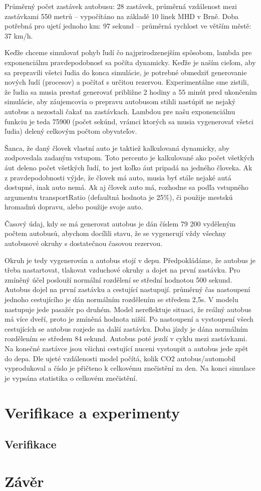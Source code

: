 \documentclass[a4paper, 11pt]{article}
\begin{document}
Průměrný počet zastávek autobusu: 28 zastávek, průměrná vzdálenost mezi zastávkami 550 metrů – vypočítáno na základě 10 linek MHD v Brně. Doba potřebná pro ujetí jednoho km: 97 sekund – průměrná rychlost ve větším městě: 37 km/h. 

Keďže chceme simulovať pohyb ľudí čo najprirodzenejším spôsobom, lambda pre exponenciálnu pravdepodobnosť sa počíta dynamicky. Keďže je naším cieľom, aby sa prepravili všetci ľudia do konca simulácie, je potrebné obmedziť generovanie nových ľudí (procesov) a počítať s určitou rezervou. Experimentálne sme zistili, že ľudia sa musia prestať generovať približne 2 hodiny a 55 minút pred ukončením simulácie, aby záujemcovia o prepravu autobusom stihli nastúpiť ne nejaký autobus a nezostali čakať na zastávkach. Lambdou pre našu exponenciálnu funkciu je teda 75900 (počet sekúnd, vrámci ktorých sa musia vygenerovať všetci ľudia) delený celkovým počtom obyvateľov.

Šanca, že daný človek vlastní auto je taktiež kalkulovaná dynamicky, aby zodpovedala zadaným vstupom. Toto percento je kalkulované ako počet všetkých áut deleno počet všetkých ľudí, to jest koľko áut pripadá na jedného človeka. Ak z pravdepodobnosti výjde, že človek má auto, musia byť stále nejaké autá dostupné, inak auto nemá. Ak aj človek auto má, rozhodne sa podľa vstupného argumentu transportRatio (defaultná hodnota je 25\%), či použije mestskú hromadnú dopravu, alebo použije svoje auto. 



Časový údaj, kdy se má generovat autobus je dán číslem 79 200 vyděleným počtem autobusů, abychom docílili stavu, že se vygenerují vždy všechny autobusové okruhy s dostatečnou časovou rezervou. 

Okruh je tedy vygenerován a autobus stojí v depu. Předpokládáme, že autobus je třeba nastartovat, tlakovat vzduchové okruhy a dojet na první zastávku. Pro zmíněný účel poslouží normální rozdělení se střední hodnotou 500 sekund. Autobus dojel na první zastávku a cestující nastupují. průměrný čas nastoupení jednoho cestujícího je dán normálním rozdělením se středem 2,5s. V modelu nastupuje jede pasažér po druhém. Model nereflektuje situaci, že reálný autobus má více dveří, proto je zmíněná hodnota nižší. 
Po nastoupení a vystoupení všech cestujících se autobus rozjede na další zastávku. Doba jízdy je dána normálním rozdělením se středem 84 sekund. Autobus poté jezdí v cyklu mezi zastávkami. Na konečné zastávce jsou všichni cestující nuceni vystoupit a autobus jede zpět do depa. Dle ujeté vzdálenosti model počítá, kolik CO2 autobus/automobil vyprodukoval a číslo je přičteno k celkovému znečistění za den. Na konci simulace je vypsána statistika o celkovém znečistění.


\section{Verifikace a experimenty}
\subsection{Verifikace}
\section{Závěr}

\newpage


\end{document}
